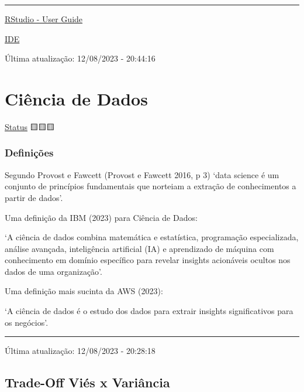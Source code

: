 \documentclass[
  letterpaper,
  DIV=11,
  numbers=noendperiod]{scrreprt}
\begin{document}
\begin{center}\rule{0.5\linewidth}{0.5pt}\end{center}

\href{https://docs.posit.co/ide/user/}{RStudio - User Guide}

\href{https://en.wikipedia.org/wiki/Integrated_development_environment}{IDE}

Última atualização: 12/08/2023 - 20:44:16

\part{Ciência de Dados}

\protect\hyperlink{status-do-material}{Status} 🟨🟨🟨

\hypertarget{definiuxe7uxf5es}{%
\section*{Definições}\label{definiuxe7uxf5es}}


Segundo Provost e Fawcett (Provost e Fawcett 2016, p 3) `data science é
um conjunto de princípios fundamentais que norteiam a extração de
conhecimentos a partir de dados'.

Uma definição da IBM (2023) para Ciência de Dados:

`A ciência de dados combina matemática e estatística, programação
especializada, análise avançada, inteligência artificial (IA) e
aprendizado de máquina com conhecimento em domínio específico para
revelar insights acionáveis ocultos nos dados de uma organização'.

Uma definição mais sucinta da AWS (2023):

`A ciência de dados é o estudo dos dados para extrair insights
significativos para os negócios'.

\begin{center}\rule{0.5\linewidth}{0.5pt}\end{center}

Última atualização: 12/08/2023 - 20:28:18

\hypertarget{trade-off-viuxe9s-x-variuxe2ncia}{%
\chapter{Trade-Off Viés x
Variância}\label{trade-off-viuxe9s-x-variuxe2ncia}}
\end{document}
